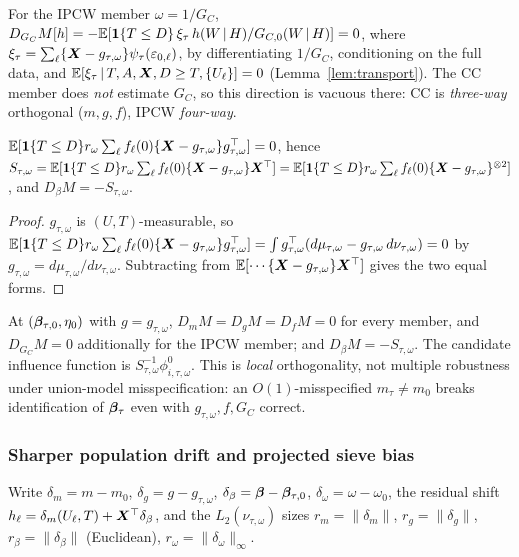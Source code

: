 \begin{lemma}\label{lem:G}
For the IPCW member $\omega=1/G_C$,
$D_{G_C}M[h]=-\mathbb{E}[\mathbf{1}\{T\le D\}\,\xi_\tau\,h(W\,\vert\, H)/G_{C,0}(W\,\vert\, H)]=0$,
where $\xi_\tau=\sum_\ell\{\bm{X}-g_{\tau,\omega}\}\psi_\tau(\varepsilon_{0,\ell})$,
by differentiating $1/G_C$, conditioning on the full data, and
$\mathbb{E}[\xi_\tau\,\vert\, T,A,\bm{X},D\ge T,\{U_\ell\}]=0$ (Lemma~\ref{lem:transport}). The
CC member does \emph{not} estimate $G_C$, so this direction is vacuous there:
CC is \emph{three-way} orthogonal ($m,g,f$), IPCW \emph{four-way}.
\end{lemma}

\begin{corollary}\label{cor:S}
$\mathbb{E}[\mathbf{1}\{T\le D\}r_{\omega}\sum_\ell f_\ell(0)\{\bm{X}-g_{\tau,\omega}\}g_{\tau,\omega}^\top]
=0$, hence
$S_{\tau,\omega}=\mathbb{E}[\mathbf{1}\{T\le D\}r_{\omega}\sum_\ell f_\ell(0)\{\bm{X}-g_{\tau,\omega}\}
\bm{X}^\top]=\mathbb{E}[\mathbf{1}\{T\le D\}r_{\omega}\sum_\ell f_\ell(0)\{\bm{X}-g_{\tau,\omega}\}^{\otimes2}]$,
and $D_\beta M=-S_{\tau,\omega}$.
\end{corollary}
\begin{proof}
$g_{\tau,\omega}$ is $(U,T)$-measurable, so
$\mathbb{E}[\mathbf{1}\{T\le D\}r_{\omega}\sum_\ell f_\ell(0)\{\bm{X}-g_{\tau,\omega}\}g_{\tau,\omega}^\top]
=\int g_{\tau,\omega}^\top(d\mu_{\tau,\omega}-g_{\tau,\omega}\,d\nu_{\tau,\omega})
=0$ by $g_{\tau,\omega}=d\mu_{\tau,\omega}/d\nu_{\tau,\omega}$. Subtracting from
$\mathbb{E}[\cdots\{\bm{X}-g_{\tau,\omega}\}\bm{X}^\top]$ gives the two equal forms.
\end{proof}

\begin{theorem}\label{thm:orth}
At $(\bm{\beta}_{\tau,0},\eta_0)$ with $g=g_{\tau,\omega}$, $D_mM=D_gM=D_fM=0$ for
every member, and $D_{G_C}M=0$ additionally for the IPCW member; and
$D_\beta M=-S_{\tau,\omega}$. The candidate influence function is
$S_{\tau,\omega}^{-1}\phi^0_{i,\tau,\omega}$. This is \emph{local} orthogonality,
not multiple robustness under union-model misspecification: an $O(1)$-misspecified
$m_\tau\neq m_0$ breaks identification of $\bm{\beta}_\tau$ even with
$g_{\tau,\omega},f,G_C$ correct.
\end{theorem}

\subsubsection{Sharper population drift and projected sieve bias}\label{sec:drift}
Write $\delta_m=m-m_0$, $\delta_g=g-g_{\tau,\omega}$,
$\delta_\beta=\bm{\beta}-\bm{\beta}_{\tau,0}$, $\delta_\omega=\omega-\omega_0$, the
residual shift $h_\ell=\delta_m(U_\ell,T)+\bm{X}^\top\delta_\beta$, and the
$L_2(\nu_{\tau,\omega})$ sizes $r_m=\|\delta_m\|$, $r_g=\|\delta_g\|$,
$r_\beta=\|\delta_\beta\|$ (Euclidean), $r_\omega=\|\delta_\omega\|_\infty$.

